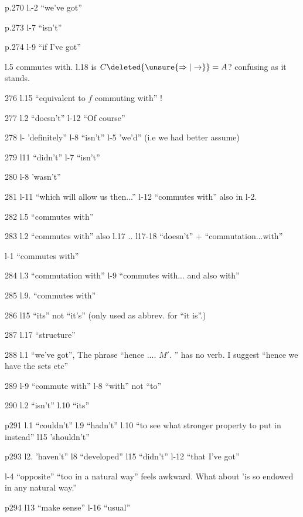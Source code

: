 p.270 l.-2 ``we've got''

p.273 l-7 ``isn't''

p.274 l-9 ``if I've got''


l.5 commutes with. l.18 is $C\deleted{\unsure{\Rightarrow|\to}}=A$? confusing as it stands.

276 l.15 ``equivalent to $f$ commuting with'' !

277 l.2 ``doesn't'' l-12 ``Of course''

278 l- 'definitely'' l-8 ``isn't'' l-5 'we'd'' (i.e we had better assume)

279 l11 ``didn't'' l-7 ``isn't''

280 l-8 'wasn't''

281 l-11 ``which will allow us then...'' l-12 ``commutes with'' also in l-2.

282 l.5 ``commutes with''

283 l.2 ``commutes with'' also l.17 .. l17-18 ``doesn't'' + ``commutation...with''

l-1 ``commutes with''

284 l.3 ``commutation with'' l-9 ``commutes with... and also with''

285 l.9. ``commutes with''

286 l15 ``its'' not ``it's'' (only used as abbrev. for ``it is''.)

287 l.17 ``structure''

288 l.1 ``we've got'', The phrase ``hence .... $M'$. ''  has no verb. I suggest ``hence we have the sets etc''

289 l-9 ``commute with'' l-8 ``with'' not ``to''

290 l.2 ``isn't'' l.10 ``its''

p291 l.1 ``couldn't'' l.9 ``hadn't'' l.10 ``to see what  stronger property to put in instead'' l15 'shouldn't''

p293 l2. 'haven't'' l8 ``developed'' l15 ``didn't'' l-12 ``that I've got''

l-4 ``opposite''  ``too in a natural way'' feels awkward. What about 'is so endowed in any natural way.''

p294 l13 ``make sense'' l-16 ``usual''


